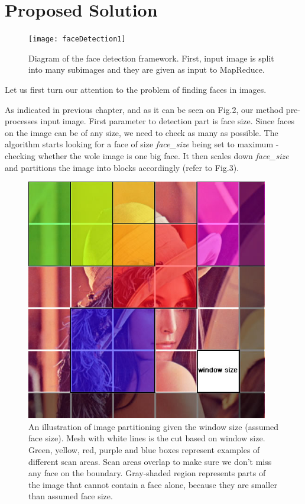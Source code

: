 \documentclass[11pt, draftclsnofoot, onecolumn]{IEEEtran}
\begin{document}
\section{Proposed Solution} \label{sec:solution}

\begin{figure}
\centering
\texttt{[image: faceDetection1]}
\caption{Diagram of the face detection framework. First, input image is split into many subimages and they are given as input to MapReduce.}
\end{figure}

Let us first turn our attention to the problem of finding faces in images.

As indicated in previous chapter, and as it can be seen on Fig.2, our method pre-processes input image. First parameter to detection part is face size. Since faces on the image can be of any size, we need to check as many as possible. The algorithm starts looking for a face of size \emph{face\_size} being set to maximum - checking whether the wole image is one big face. It then scales down \emph{face\_size} and partitions the image into blocks accordingly (refer to Fig.3).

\begin{figure}[t!]
\centering
\includegraphics[width=300pt, height=300pt]{img1}
\caption{An illustration of image partitioning given the window size (assumed face size). Mesh with white lines is the cut based on window size. Green, yellow, red, purple and blue boxes represent examples of different scan areas. Scan areas overlap to make sure we don't miss any face on the boundary. Gray-shaded region represents parts of the image that cannot contain a face alone, because they are smaller than assumed face size.}
\end{figure}
\end{document}
